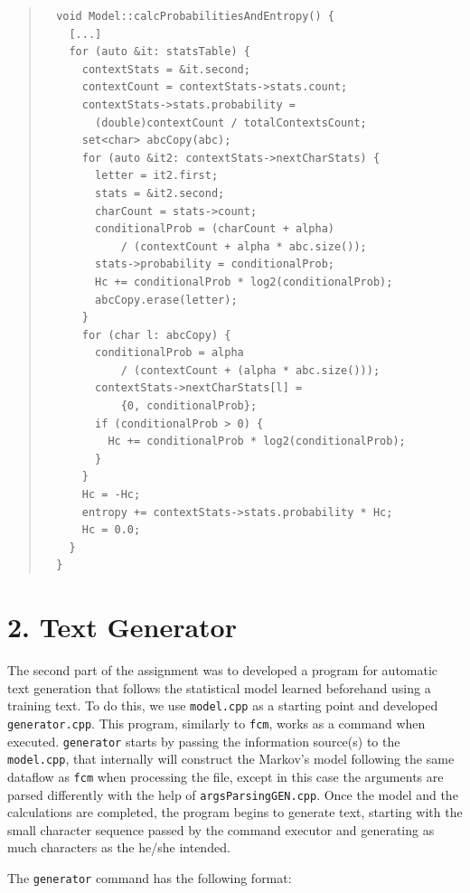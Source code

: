 \documentclass[12pt]{article}
\begin{document}
\begingroup
\addtolength\leftmargini{-0.4in}
\addtolength\baselineskip{-0.05in}
\begin{quote}
\begin{verbatim}
  void Model::calcProbabilitiesAndEntropy() {
    [...]
    for (auto &it: statsTable) {
      contextStats = &it.second;
      contextCount = contextStats->stats.count;
      contextStats->stats.probability = 
        (double)contextCount / totalContextsCount;
      set<char> abcCopy(abc);
      for (auto &it2: contextStats->nextCharStats) {
        letter = it2.first;
        stats = &it2.second;
        charCount = stats->count;
        conditionalProb = (charCount + alpha)
            / (contextCount + alpha * abc.size());
        stats->probability = conditionalProb;
        Hc += conditionalProb * log2(conditionalProb);
        abcCopy.erase(letter);
      }
      for (char l: abcCopy) {
        conditionalProb = alpha
            / (contextCount + (alpha * abc.size()));
        contextStats->nextCharStats[l] = 
            {0, conditionalProb};
        if (conditionalProb > 0) {
          Hc += conditionalProb * log2(conditionalProb);
        }
      }
      Hc = -Hc; 
      entropy += contextStats->stats.probability * Hc;
      Hc = 0.0;
    }
  }
\end{verbatim}
\end{quote}
\endgroup

\newpage
\section*{2. Text Generator}

The second part of the assignment was to developed a program for automatic
text generation that follows the statistical model learned beforehand using 
a training text.
To do this, we use \texttt{model.cpp} as a starting point and developed 
\texttt{generator.cpp}. 
This program, similarly to \texttt{fcm}, works as a command when executed.
\texttt{generator} starts by passing the information source(s) to the 
\texttt{model.cpp}, that internally will construct the Markov's model 
following the same dataflow as \texttt{fcm} when processing the file,
except in this case the arguments are parsed differently with the help of
\texttt{argsParsingGEN.cpp}. 
Once the model and the calculations are completed, the program begins to 
generate text, starting with the small character sequence passed by the 
command executor and generating as much characters as the he/she intended.

The \texttt{generator} command has the following format: 
\end{document}
